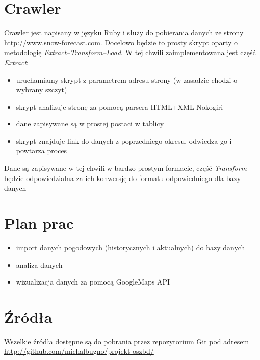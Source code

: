 \documentclass[12pt]{article}
\begin{document}
\section{Crawler}
Crawler jest napisany w języku Ruby i służy do pobierania danych ze strony
\\\url{http://www.snow-forecast.com}.
Docelowo będzie to prosty skrypt oparty o metodologię \emph{Extract--Transform--Load}. W tej chwili zaimplementowana
jest część \emph{Extract}:
\begin{itemize}
\item uruchamiamy skrypt z parametrem adresu strony (w zasadzie chodzi o wybrany szczyt)
\item skrypt analizuje stronę za pomocą parsera HTML+XML Nokogiri
\item dane zapisywane są w prostej postaci w tablicy
\item skrypt znajduje link do danych z poprzedniego okresu, odwiedza go i powtarza proces
\end{itemize}

Dane są zapisywane w tej chwili w bardzo prostym formacie, część \emph{Transform} będzie odpowiedzialna
za ich konwersję do formatu odpowiedniego dla bazy danych

\section{Plan prac}
\begin{itemize}
\item import danych pogodowych (historycznych i aktualnych) do bazy danych
\item analiza danych
\item wizualizacja danych za pomocą GoogleMaps API
\end{itemize}

\section{Źródła}
Wszelkie źródła dostępne są do pobrania przez repozytorium Git pod adresem
\\
\url{http://github.com/michalbugno/projekt-oszbd/}
\end{document}
